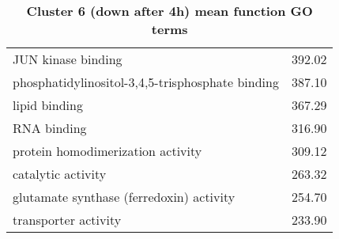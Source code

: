 \begin{table}[hp]
\begin{center}
\begin{tabular}{p{}r}
JUN kinase binding                                            & 392.02                      \\ %
phosphatidylinositol-3,4,5-trisphosphate binding              & 387.10                      \\ %
lipid binding                                                 & 367.29                      \\ 
RNA binding                                                   & 316.90                      \\
protein homodimerization activity                             & 309.12                      \\ %
catalytic activity                                            & 263.32                      \\
glutamate synthase (ferredoxin) activity                      & 254.70                      \\ %
transporter activity                                          & 233.90                      \\ \bottomrule
\end{tabular}
\end{center}

\caption[Cluster 6 (down after 4h) mean function GO terms]{\sf \textbf{Cluster 6 (down after 4h) mean function GO terms}}
\label{tab:cls6-function}
\end{table}